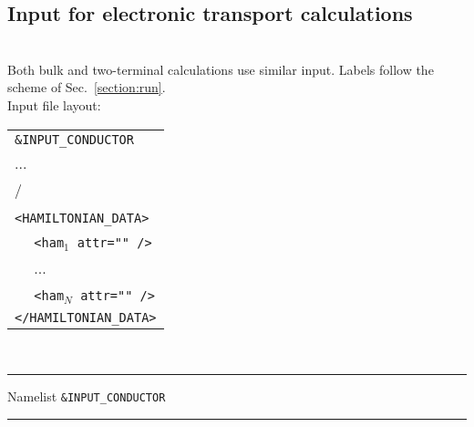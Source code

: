\subsection{Input for electronic transport calculations}
\\
\noindent Both bulk and two-terminal calculations use similar input. 
Labels follow the scheme of Sec.~\ref{section:run}.\\

\noindent Input file layout: \\

%
%
\begin{tabular}{l}
{\tt \&INPUT\_CONDUCTOR }\\
   ... \\
  / \\
  \\
{\tt <HAMILTONIAN\_DATA>} \\
  $\quad$ {\tt <ham$_1$   attr="" />} \\
  $\quad$ ...  \\
  $\quad$ {\tt <ham$_N$   attr="" />} \\
{\tt </HAMILTONIAN\_DATA>}
%
\end{tabular}
%
%
\\

\begin{centering}
\rule{2.2in}{0.01in} Namelist {\tt \&INPUT\_CONDUCTOR} \rule{2.2in}{0.01in}
\end{centering}\\

